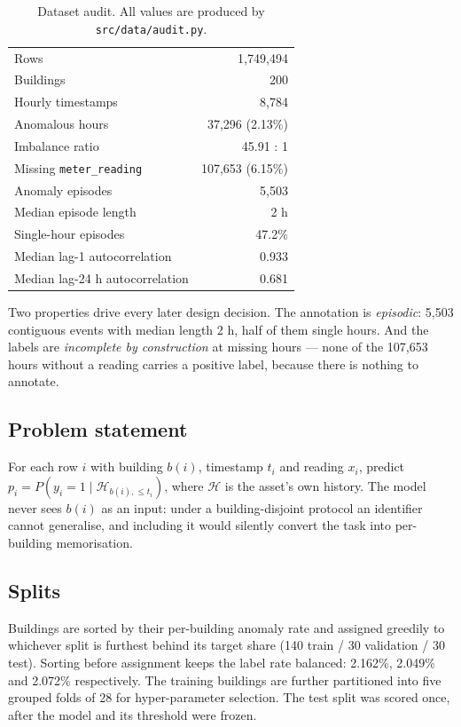 \documentclass[conference]{IEEEtran}
\begin{document}
\begin{table}[t]
\centering
\caption{Dataset audit. All values are produced by \texttt{src/data/audit.py}.}
\label{tab:audit}
\begin{tabular}{lr}
\toprule
Rows & 1{,}749{,}494 \\
Buildings & 200 \\
Hourly timestamps & 8{,}784 \\
Anomalous hours & 37{,}296 (2.13\%) \\
Imbalance ratio & 45.91 : 1 \\
Missing \texttt{meter\_reading} & 107{,}653 (6.15\%) \\
Anomaly episodes & 5{,}503 \\
Median episode length & 2 h \\
Single-hour episodes & 47.2\% \\
Median lag-1 autocorrelation & 0.933 \\
Median lag-24 h autocorrelation & 0.681 \\
\bottomrule
\end{tabular}
\end{table}

Two properties drive every later design decision. The annotation is \emph{episodic}: 5{,}503
contiguous events with median length 2 h, half of them single hours. And the labels are
\emph{incomplete by construction} at missing hours --- none of the 107{,}653 hours without a reading
carries a positive label, because there is nothing to annotate.

\subsection{Problem statement}

For each row $i$ with building $b(i)$, timestamp $t_i$ and reading $x_i$, predict
$p_i = P(y_i = 1 \mid \mathcal{H}_{b(i), \le t_i})$, where $\mathcal{H}$ is the asset's own history.
The model never sees $b(i)$ as an input: under a building-disjoint protocol an identifier cannot
generalise, and including it would silently convert the task into per-building memorisation.

\subsection{Splits}

Buildings are sorted by their per-building anomaly rate and assigned greedily to whichever split is
furthest behind its target share (140 train / 30 validation / 30 test). Sorting before assignment keeps
the label rate balanced: 2.162\%, 2.049\% and 2.072\% respectively. The training buildings are further
partitioned into five grouped folds of 28 for hyper-parameter selection. The test split was scored once,
after the model and its threshold were frozen.
\end{document}
